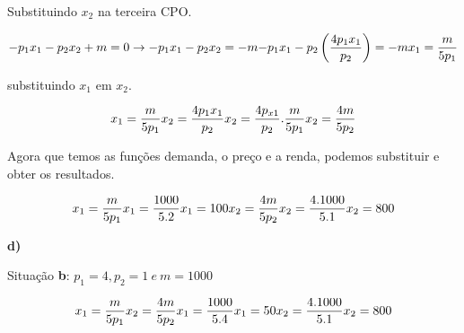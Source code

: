 \begin{flushleft}
	\begin{center}
		Substituindo $x_{2}$ na terceira CPO.
	\end{center}

	\begin{equation}
		-p_{1}x_{1} - p_{2}x_{2} + m =0 \rightarrow -p_{1}x_{1} - p_{2}x_{2} = -m
		$$\\$$
		-p_{1}x_{1} - p_{2}\left( \dfrac{4p_{1}x_{1}}{p_{2}} \right) = -m
		$$\\$$
		x_{1} = \dfrac{m}{5p_{1}}
	\end{equation}

	\begin{center}
		substituindo $x_{1}$ em $x_{2}$.
	\end{center}

	\begin{equation}
		x_{1} = \dfrac{m}{5p_{1}}
		$$\\$$
		x_{2} = \dfrac{4p_{1}x_{1}} {p_{2}}
		$$\\$$
		x_{2} = \dfrac{4p_{x1}}{p_{2}}.\dfrac{m}{5p_{1}} 
		$$\\$$
		x_{2} = \dfrac{4m}{5p_{2}}
	\end{equation}

	\begin{center}
		Agora que temos as funções demanda, o preço e a renda, podemos substituir e obter os resultados.
	\end{center}

	\begin{equation}
		x_{1} = \dfrac{m}{5p_{1}}
		$$\\$$
		x_{1} = \dfrac{1000}{5.2}
		$$\\$$
		x_{1} = 100
		$$\\$$
		x_{2} = \dfrac{4m}{5p_{2}}
		$$\\$$
		x_{2} = \dfrac{4.1000}{5.1}
		$$\\$$
		x_{2} = 800
	\end{equation}
	
	\textbf{d)}
	\\
\begin{center}
	Situação \textbf{b}: $p_{1} = 4, p_{2} = 1 \ e \ m = 1000$
\end{center}

\begin{equation}
	x_{1} = \dfrac{m}{5p_{1}}
	$$\\$$
	x_{2} = \dfrac{4m}{5p_{2}} 
	$$\\$$
	x_{1} = \dfrac{1000}{5.4}
	$$\\$$
	x_{1} = 50
	$$\\$$
	x_{2} = \dfrac{4.1000}{5.1}
	$$\\$$
	x_{2} = 800
\end{equation}


\end{flushleft}
